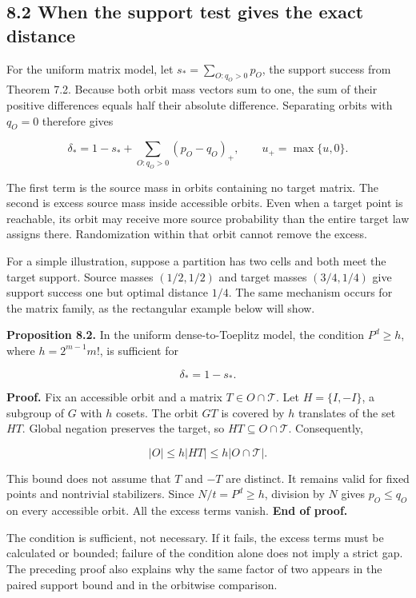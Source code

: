 \documentclass[
]{article}
\begin{document}
\subsection{8.2 When the support test gives the exact
distance}\label{when-the-support-test-gives-the-exact-distance}

For the uniform matrix model, let \(s_* =\sum_{O:q_O>0}p_O\), the
support success from Theorem 7.2. Because both orbit mass vectors sum to
one, the sum of their positive differences equals half their absolute
difference. Separating orbits with \(q_O=0\) therefore gives

\[
\delta_*=1-s_*+
\sum_{O:q_O>0}(p_O-q_O)_+,
\qquad u_+=\max\{u,0\}.
\]

The first term is the source mass in orbits containing no target matrix.
The second is excess source mass inside accessible orbits. Even when a
target point is reachable, its orbit may receive more source probability
than the entire target law assigns there. Randomization within that
orbit cannot remove the excess.

For a simple illustration, suppose a partition has two cells and both
meet the target support. Source masses \((1/2,1/2)\) and target masses
\((3/4,1/4)\) give support success one but optimal distance \(1/4\). The
same mechanism occurs for the matrix family, as the rectangular example
below will show.

\textbf{Proposition 8.2.} In the uniform dense-to-Toeplitz model, the
condition \(P^d\ge h\), where \(h=2^{m-1}m!\), is sufficient for

\[
\delta_*=1-s_*.
\]

\textbf{Proof.} Fix an accessible orbit and a matrix
\(T\in O\cap\mathcal T\). Let \(H=\{I,-I\}\), a subgroup of \(G\) with
\(h\) cosets. The orbit \(GT\) is covered by \(h\) translates of the set
\(HT\). Global negation preserves the target, so
\(HT\subseteq O\cap\mathcal T\). Consequently,

\[
|O|\le h|HT|\le h|O\cap\mathcal T|.
\]

This bound does not assume that \(T\) and \(-T\) are distinct. It
remains valid for fixed points and nontrivial stabilizers. Since
\(N/t=P^d\ge h\), division by \(N\) gives \(p_O\le q_O\) on every
accessible orbit. All the excess terms vanish. \textbf{End of proof.}

The condition is sufficient, not necessary. If it fails, the excess
terms must be calculated or bounded; failure of the condition alone does
not imply a strict gap. The preceding proof also explains why the same
factor of two appears in the paired support bound and in the orbitwise
comparison.
\end{document}
